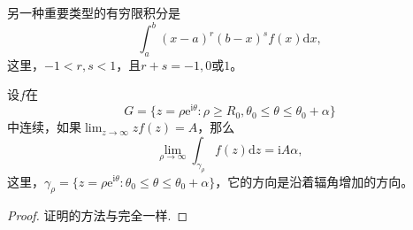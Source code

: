 \documentclass[../../main.tex]{subfiles}
\begin{document}
另一种重要类型的有穷限积分是
\[
\int_{a}^{b} (x - a)^r (b - x)^s f(x) \mathrm{d}x,
\]
这里，\( -1 < r, s < 1 \)，且\( r + s = -1, 0 \)或\( 1 \)。

\begin{lemma}\label{lemma:引理5.5.15}
设\( f \)在
\[
G = \{ z = \rho \mathrm{e}^{\mathrm{i}\theta} : \rho \geqslant R_0, \theta_0 \leqslant \theta \leqslant \theta_0 + \alpha \}
\]
中连续，如果\(\lim_{z \to \infty} z f(z) = A\)，那么
\[
\lim_{\rho \to \infty} \int_{\gamma_{\rho}} f(z) \mathrm{d}z = \mathrm{i}A\alpha,
\]
这里，\(\gamma_{\rho} = \{ z = \rho \mathrm{e}^{\mathrm{i}\theta} : \theta_0 \leqslant \theta \leqslant \theta_0 + \alpha \}\)，它的方向是沿着辐角增加的方向。
\end{lemma}
\begin{proof}
证明的方法与完全一样.

\end{proof}
\end{document}
